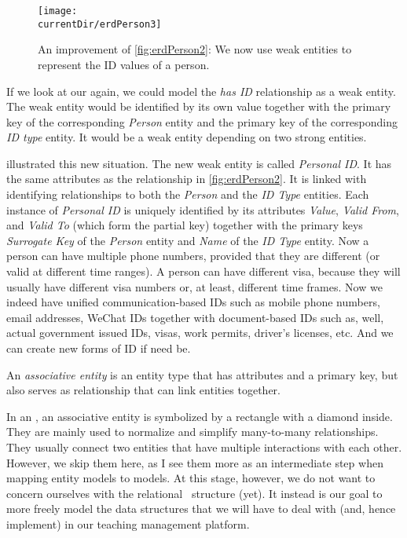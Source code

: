 \begin{figure}%
\centering%
\texttt{[image: \\currentDir/erdPerson3]}%
\caption{An improvement of \cref{fig:erdPerson2}: We now use weak entities to represent the ID values of a person.}%
\label{fig:erdPerson3}%
\end{figure}%
%
If we look at our  again, we could model the \emph{has ID} relationship as a weak entity.
The weak entity would be identified by its own value together with the primary key of the corresponding \emph{Person} entity and the primary key of the corresponding \emph{ID type} entity.
It would be a weak entity depending on two strong entities.

 illustrated this new situation.
The new weak entity is called \emph{Personal ID}.
It has the same attributes as the relationship in \cref{fig:erdPerson2}.
It is linked with identifying relationships to both the \emph{Person} and the \emph{ID Type} entities.
Each instance of \emph{Personal ID} is uniquely identified by its attributes \emph{Value}, \emph{Valid From}, and \emph{Valid To} (which form the partial key) together with the primary keys \emph{Surrogate Key} of the \emph{Person} entity and \emph{Name} of the \emph{ID Type} entity.
Now a person can have multiple phone numbers, provided that they are different (or valid at different time ranges).
A person can have different visa, because they will usually have different visa numbers or, at least, different time frames.
Now we indeed have unified communication-based IDs such as mobile phone numbers, email addresses, WeChat IDs together with document-based IDs such as, well, actual government issued IDs, visas, work permits, driver's licenses, etc.
And we can create new forms of ID if need be.%
%
\begin{definition}%
An \emph{associative entity} is an entity type that has attributes and a primary key, but also serves as relationship that can link entities together.%
\end{definition}%
%
In an , an associative entity is symbolized by a rectangle with a diamond inside.
They are mainly used to normalize and simplify many-to-many relationships.
They usually connect two entities that have multiple interactions with each other.
However, we skip them here, as I see them more as an intermediate step when mapping entity models to  models.
At this stage, however, we do not want to concern ourselves with the relational \db\ structure (yet).
It instead is our goal to more freely model the data structures that we will have to deal with (and, hence implement) in our teaching management platform.%
%
\FloatBarrier%
\endhsection%
%
